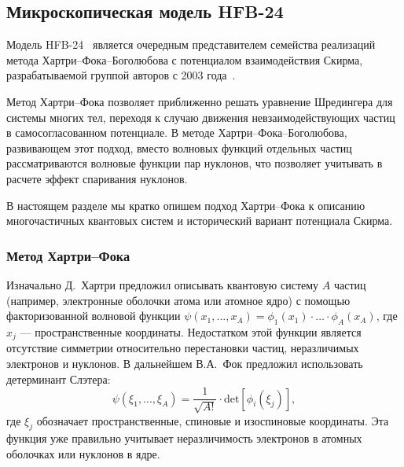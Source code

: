 \subsection{Микроскопическая модель HFB-24}
Модель HFB-24~\cite{goriely2013} является очередным представителем семейства реализаций метода Хартри--Фока--Боголюбова с потенциалом взаимодействия Скирма, разрабатываемой группой авторов с 2003 года~\cite{samyn2003}. 

Метод Хартри--Фока позволяет приближенно решать уравнение Шредингера для системы многих тел, переходя к случаю движения невзаимодействующих частиц в самосогласованном потенциале. В методе Хартри--Фока--Боголюбова, развивающем этот подход, вместо волновых функций отдельных частиц рассматриваются волновые функции пар нуклонов, что позволяет учитывать в расчете эффект спаривания нуклонов. 

В настоящем разделе мы кратко опишем подход Хартри--Фока к описанию многочастичных квантовых систем и исторический вариант потенциала Скирма.

\subsubsection{Метод Хартри--Фока}
Изначально Д.~Хартри предложил описывать квантовую систему $A$ частиц (например, электронные оболочки атома или атомное ядро) с помощью факторизованной волновой функции $\psi(x_1, ..., x_A) = \phi_1(x_1) \cdot ... \cdot \phi_A(x_A)$, где $x_j$ --- пространственные координаты. Недостатком этой функции является отсутствие симметрии относительно перестановки частиц, неразличимых электронов и нуклонов. В дальнейшем В.А.~Фок предложил использовать детерминант Слэтера:
\begin{equation}
\displaystyle
\psi(\xi_1, ..., \xi_A) = \frac{1}{\sqrt{A!}} \cdot \text{det} 
\left[ \phi_i (\xi_j) \right],
\end{equation}
где $\xi_j$ обозначает пространственные, спиновые и изоспиновые координаты. Эта функция уже правильно учитывает неразличимость электронов в атомных оболочках или нуклонов в ядре.

